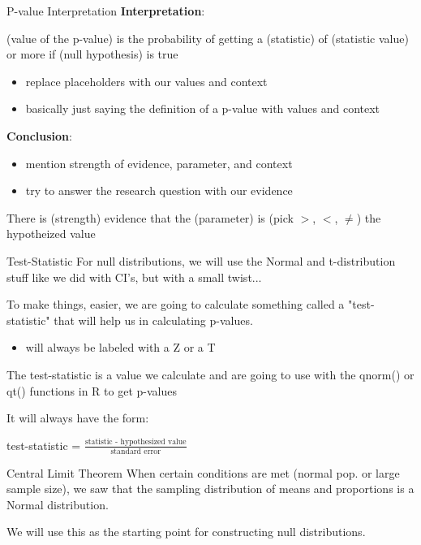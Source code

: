 \documentclass{beamer}
\begin{document}
\begin{frame}{P-value Interpretation}
\textbf{Interpretation}:

(value of the p-value) is the probability of getting a (statistic) of (statistic value) or more if (null hypothesis) is true
\begin{itemize}
    \item replace placeholders with our values and context
    \item basically just saying the definition of a p-value with values and context
\end{itemize} \vspace{8mm}

\textbf{Conclusion}: 
\begin{itemize}
    \item mention strength of evidence, parameter, and context
    \item try to answer the research question with our evidence
\end{itemize}
There is (strength) evidence that the (parameter) is (pick $>$, $<$, $\neq$) the hypotheized value
\end{frame}

\begin{frame}{Test-Statistic}
For null distributions, we will use the Normal and t-distribution stuff like we did with CI's, but with a small twist... \vspace{8mm}

To make things, easier, we are going to calculate something called a "test-statistic" that will help us in calculating p-values.
\begin{itemize}
    \item will always be labeled with a Z or a T
\end{itemize} \vspace{8mm}

The test-statistic is a value we calculate and are going to use with the qnorm() or qt() functions in R to get p-values \vspace{6mm}

It will always have the form: \vspace{2mm}

test-statistic = $\frac{\text{statistic - hypothesized value}}{\text{standard error}}$
\end{frame}

\begin{frame}{Central Limit Theorem}
When certain conditions are met (normal pop. or large sample size), we saw that the sampling distribution of means and proportions is a Normal distribution. \vspace{12mm}

We will use this as the starting point for constructing null distributions.
\end{frame}
\end{document}
